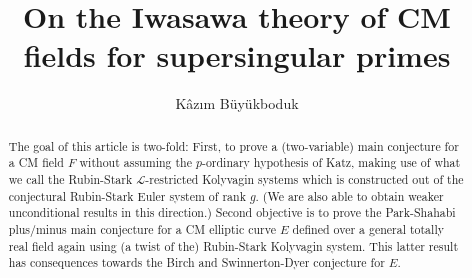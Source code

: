 \documentclass[12pt]{amsart}
\numberwithin{equation}{section}
\begin{document}
\title{O\lowercase{n the }I\lowercase{wasawa theory of} CM \lowercase{fields for supersingular primes}}

\author{K\^az\i m B\"uy\"ukboduk}

\address{K\^az\i m B\"uy\"ukboduk \hfill\break\indent Ko\c{c} University Mathematics, 34450 Sariyer, Istanbul, Turkey
\hfill\break\indent}


\begin{abstract}
The goal of this article is two-fold: First, to prove a (two-variable) main conjecture for a CM field $F$ without assuming the $p$-ordinary hypothesis of Katz, making use of what we call the Rubin-Stark ${\mathcal{L}}$-restricted Kolyvagin systems which is constructed out of the conjectural Rubin-Stark Euler system of rank $g$. (We are also able to obtain weaker unconditional results in this direction.) Second objective is to prove the Park-Shahabi plus/minus main conjecture for a CM elliptic curve $E$ defined over a general totally real field again using (a twist of the) Rubin-Stark Kolyvagin system. This latter result has consequences towards the Birch and Swinnerton-Dyer conjecture for $E$. 
\end{abstract}

\maketitle
\tableofcontents
\end{document}
